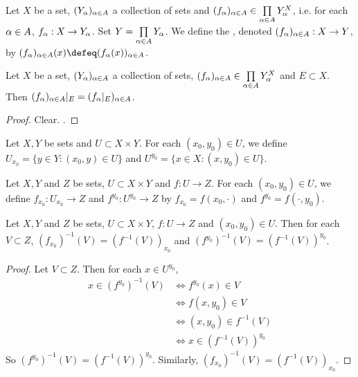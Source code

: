 \documentclass{book}
\begin{document}
	\begin{defn} 
		Let $X$ be a set, $(Y_{\alpha})_{\alpha \in A}$ a collection of sets and $(f_{\alpha})_{\alpha \in A} \in \prod\limits_{\alpha \in A} Y_{\alpha}^X$, i.e. for each $\alpha \in A$, $f_{\alpha}:X \rightarrow Y_{\alpha}$. Set $Y = \prod\limits_{\alpha \in A}Y_{\alpha}$. We define the , denoted $(f_{\alpha})_{\alpha \in A}: X \rightarrow Y$, by $(f_{\al})_{\al \in A}(x) \defeq (f_{\al}(x))_{\al \in A}$.
	\end{defn}

	\begin{ex} 
		Let $X$ be a set, $(Y_{\alpha})_{\alpha \in A}$ a collection of sets, $(f_{\alpha})_{\alpha \in A} \in \prod\limits_{\alpha \in A} Y_{\alpha}^X$ and $E \subset X$. Then $(f_{\alpha})_{\alpha \in A}|_E = (f_{\alpha}|_E)_{\alpha \in A}$.
	\end{ex}

	\begin{proof}
		Clear. .
	\end{proof}

	\begin{defn}   
		Let $X, Y$ be sets and $U \subset X \times Y$. For each $(x_0, y_0) \in U$, we define $U_{x_0} = \{y \in Y: (x_0,y) \in U\}$ and $U^{y_0} = \{x \in X: (x,y_0) \in U\}$.
	\end{defn}

	\begin{defn}   
		Let $X, Y$ and $Z$ be sets, $U \subset X \times Y$ and $f: U \rightarrow Z$. For each $(x_0, y_0) \in U$, we define $f_{x_0}: U_{x_0} \rightarrow Z$ and $f^{y_0}: U^{y_0} \rightarrow Z$ by $f_{x_0} = f(x_0, \cdot)$ and $f^{y_0} = f(\cdot, y_0)$.
	\end{defn}
	
	\begin{ex} 
		Let $X, Y$ and $Z$ be sets, $U \subset X \times Y$, $f: U \rightarrow Z$ and $(x_0, y_0) \in U$. Then for each $V \subset Z$, $(f_{x_0})^{-1}(V) = (f^{-1}(V))_{x_0}$ and $(f^{y_0})^{-1}(V) = (f^{-1}(V))^{y_0}$.
	\end{ex}

	\begin{proof}
		Let $V \subset Z$. Then for each $x \in U^{y_0}$,
		\begin{align*}
			x \in (f^{y_0})^{-1}(V) 
			& \iff f^{y_0}(x) \in V \\
			& \iff f(x, y_0) \in V \\
			& \iff (x, y_0) \in f^{-1}(V) \\
			& \iff x \in (f^{-1}(V))^{y_0}
		\end{align*}
		So $(f^{y_0})^{-1}(V) = (f^{-1}(V))^{y_0}$. Similarly, $(f_{x_0})^{-1}(V) = (f^{-1}(V))_{x_0}$. 
	\end{proof}
	
\end{document}
